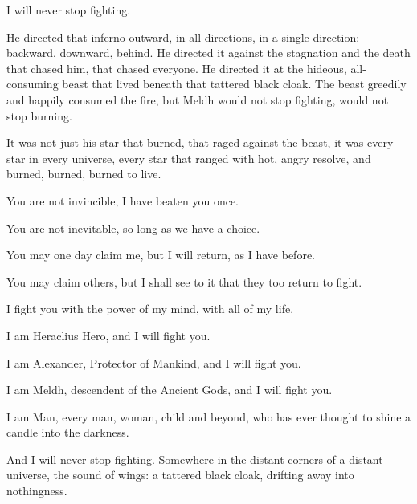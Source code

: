 I will never stop fighting.

He directed that inferno outward, in all directions, in a single direction: backward, downward, behind. He directed it against the stagnation and the death that chased him, that chased everyone. He directed it at the hideous, all-consuming beast that lived beneath that tattered black cloak. The beast greedily and happily consumed the fire, but Meldh would not stop fighting, would not stop burning.

It was not just his star that burned, that raged against the beast, it was every star in every universe, every star that ranged with hot, angry resolve, and burned, burned, burned to live.

You are not invincible, I have beaten you once.

You are not inevitable, so long as we have a choice.

You may one day claim me, but I will return, as I have before.

You may claim others, but I shall see to it that they too return to fight.

I fight you with the power of my mind, with all of my life.

I am Heraclius Hero, and I will fight you.

I am Alexander, Protector of Mankind, and I will fight you.

I am Meldh, descendent of the Ancient Gods, and I will fight you.

I am Man, every man, woman, child and beyond, who has ever thought to shine a candle into the darkness.

And I will never stop fighting.
\simpleline
Somewhere in the distant corners of a distant universe, the sound of wings: a tattered black cloak, drifting away into nothingness.
